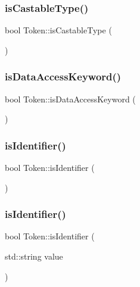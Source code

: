 \mbox{\label{classToken_a12323f98c2de851b0194e7113c28e739}} 
\subsubsection{\texorpdfstring{is\+Castable\+Type()}{isCastableType()}}
{\footnotesize\ttfamily bool Token\+::is\+Castable\+Type (\begin{DoxyParamCaption}{ }\end{DoxyParamCaption})}

\mbox{\label{classToken_a8740433e25b7cc9298c98ce4bac88c42}} 
\subsubsection{\texorpdfstring{is\+Data\+Access\+Keyword()}{isDataAccessKeyword()}}
{\footnotesize\ttfamily bool Token\+::is\+Data\+Access\+Keyword (\begin{DoxyParamCaption}{ }\end{DoxyParamCaption})}

\mbox{\label{classToken_ab4d90d6de9f8682d829c4e2461c6aad0}} 
\subsubsection{\texorpdfstring{is\+Identifier()}{isIdentifier()}\hspace{0.1cm}{\footnotesize\ttfamily [1/2]}}
{\footnotesize\ttfamily bool Token\+::is\+Identifier (\begin{DoxyParamCaption}{ }\end{DoxyParamCaption})}

\mbox{\label{classToken_a3763eac81818ee9664a67f2b0e058420}} 
\subsubsection{\texorpdfstring{is\+Identifier()}{isIdentifier()}\hspace{0.1cm}{\footnotesize\ttfamily [2/2]}}
{\footnotesize\ttfamily bool Token\+::is\+Identifier (\begin{DoxyParamCaption}\item[{std\+::string}]{value }\end{DoxyParamCaption})}

